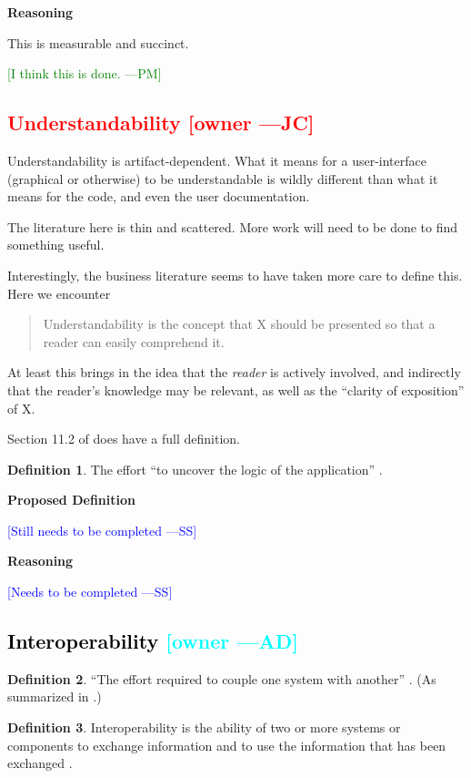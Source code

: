 \documentclass[letterpaper,cleveref]{lipics-v2019}
\newcommand{\authornote}[3]{\textcolor{#1}{[#3 ---#2]}}
\newcommand{\authornote}[3]{}
\newcommand{\wss}[1]{\authornote{blue}{SS}{#1}} %
\newcommand{\jc}[1]{\authornote{red}{JC}{#1}} %
\newcommand{\pmi}[1]{\authornote{green}{PM}{#1}} %
\newcommand{\ad}[1]{\authornote{cyan}{AD}{#1}} %
\newcommand{\notdone}[1]{\textcolor{red}{#1}}
\newcommand{\done}[1]{\textcolor{black}{#1}}
\theoremstyle{definition}
\newtheorem{defn}{Definition}
\begin{document}
\noindent \textbf{Reasoning}

This is measurable and succinct. 

\pmi{I think this is done.}

\subsection{\notdone{Understandability} \jc{owner}}

Understandability is artifact-dependent. What it means for a user-interface
(graphical or otherwise) to be understandable is wildly different than what it
means for the code, and even the user documentation.

The literature here is thin and scattered.  More work will need to be done to
find something useful.

Interestingly, the business literature seems to have taken more care to define
this.  Here we encounter
\begin{quote}
  Understandability is the concept that X should be presented so that a reader
  can easily comprehend it.
\end{quote}
At least this brings in the idea that the \emph{reader} is actively involved,
and indirectly that the reader's knowledge may be relevant, as well as the
``clarity of exposition'' of X.

Section 11.2 of \citet{adams2015nonfunctional} does have a full definition.

\begin{defn}
  The effort ``to uncover the logic of the application''
  \citep{ghezzi1991fundamentals}.
\end{defn}

\noindent \textbf{Proposed Definition}

\wss{Still needs to be completed}

\noindent \textbf{Reasoning}

\wss{Needs to be completed}

\subsection{\done{Interoperability} \ad{owner}}

\begin{defn}
  ``The effort required to couple one system with another''
  \citep{McCallEtAl1977}. (As summarized in \citet{VanVliet2000}.)
\end{defn}

\begin{defn}
  Interoperability is the ability of two or more systems or components to
  exchange information and to use the information that has been exchanged
  \citep{IEEEComputerDictionary1991}.
\end{defn}
\end{document}
